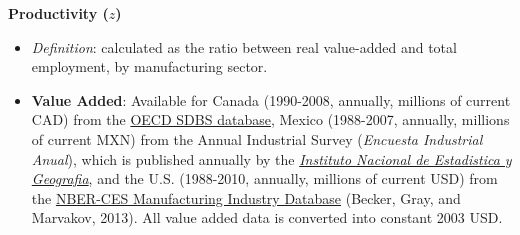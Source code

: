 \begin{spacing}{1}
	
	

\noindent \textbf{Productivity ($z$)}
	\begin{itemize}
	
	\item \emph{Definition}: calculated as the ratio between real value-added and total employment, by manufacturing sector.
	
	\item \textbf{Value Added}:  Available for Canada (1990-2008, annually, millions of current CAD) from  the \href{http://stats.oecd.org/index.aspx?queryid=224}{OECD SDBS database}, Mexico (1988-2007, annually, millions of current MXN) from the Annual Industrial Survey (\emph{Encuesta Industrial Anual}), which is published annually by   the \href{http://buscador.inegi.org.mx/search?q=encuesta+industrial+anual&client=ProductosR&proxystylesheet=ProductosR&num=10&getfields=*&sort=meta:edicion:D:E:::D&entsp=a__inegi_politica_p72&lr=lang_es\%7Clang_en&oe=UTF-8&ie=UTF-8&ip=10.210.100.253&entqr=3&filter=0&site=ProductosBuscador&tlen=260&ulang=en&start=0}{\emph{Instituto Nacional de Estadistica y Geografia}}, and the U.S. (1988-2010, annually, millions of current USD) from  the \href{http://www.nber.org/nberces/}{NBER-CES Manufacturing Industry Database} (Becker, Gray, and Marvakov, 2013). All value added data is converted into constant 2003 USD.		
	

\end{itemize}
\end{spacing}
